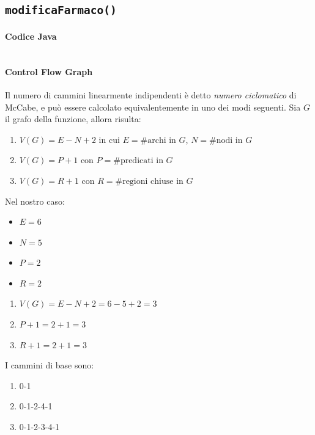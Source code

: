 

\vfill
\pagebreak

\subsection{\texttt{modificaFarmaco()}}

\paragraph{Codice Java}

\inputminted[breaklines,tabsize=4,linenos]{java}{chapters/testing_white_box/modificaFarmaco.java}

\paragraph{Control Flow Graph}\mbox{}\newline

\noindent\begin{minipage}[t]{0.58\linewidth}
	\vspace{0pt}
	Il numero di cammini linearmente indipendenti è detto \emph{numero ciclomatico} di McCabe, e può essere calcolato equivalentemente in uno dei modi seguenti. Sia $G$ il grafo della funzione, allora risulta:
	\begin{enumerate}
		\item $V(G) = E - N + 2$ in cui $E = \text{\#archi in } G$, $N = \text{\#nodi in } G$
		\item $V(G) = P + 1$ con $P = \text{\#predicati in } G$
		\item $V(G) = R + 1$ con $R = \text{\#regioni chiuse in } G$
	\end{enumerate}%
	Nel nostro caso:%
	\begin{itemize}
		\item $E = 6$
		\item $N = 5$
		\item $P = 2$
		\item $R = 2$
	\end{itemize}%
	\begin{enumerate}
		\item $V(G) = E - N + 2 = 6 - 5 + 2 = 3$
		\item $P + 1 = 2 + 1 = 3$
		\item $R + 1 = 2 + 1 = 3$
	\end{enumerate}%
	\noindent I cammini di base sono:
	\begin{enumerate}
		\item 0-1
		\item 0-1-2-4-1
		\item 0-1-2-3-4-1
	\end{enumerate}
\end{minipage}
\hfill
\noindent\begin{minipage}[t]{0.38\linewidth}
	\vspace{0pt}
	
\end{minipage}

